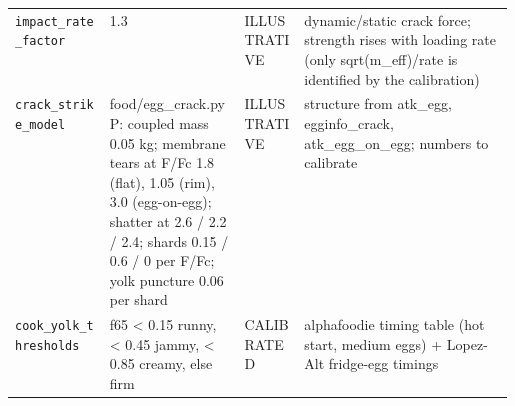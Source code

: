 \documentclass[10.5pt,a4paper]{article}
\begin{document}
\begin{table}[htbp]
\begin{tabularx}{\linewidth}{@{}p{0.19\linewidth}p{0.27\linewidth}p{0.12\linewidth}X@{}}
\texttt{impact\_\allowbreak{}rate\_\allowbreak{}factor} & 1.3 & ILLUSTRATIVE & dynamic/static crack force; strength rises with loading rate (only sqrt(m\_eff)/rate is identified by the calibration) \\
\texttt{crack\_\allowbreak{}strike\_\allowbreak{}model} & food/egg\_crack.py P: coupled mass 0.05 kg; membrane tears at F/Fc 1.8 (flat), 1.05 (rim), 3.0 (egg-on-egg); shatter at 2.6 / 2.2 / 2.4; shards 0.15 / 0.6 / 0 per F/Fc; yolk puncture 0.06 per shard & ILLUSTRATIVE & structure from atk\_egg, egginfo\_crack, atk\_egg\_on\_egg; numbers to calibrate \\
\texttt{cook\_\allowbreak{}yolk\_\allowbreak{}thresholds} & f65 < 0.15 runny, < 0.45 jammy, < 0.85 creamy, else firm & CALIBRATED & alphafoodie timing table (hot start, medium eggs) + Lopez-Alt fridge-egg timings \\\bottomrule\end{tabularx}\end{table}
\end{document}
